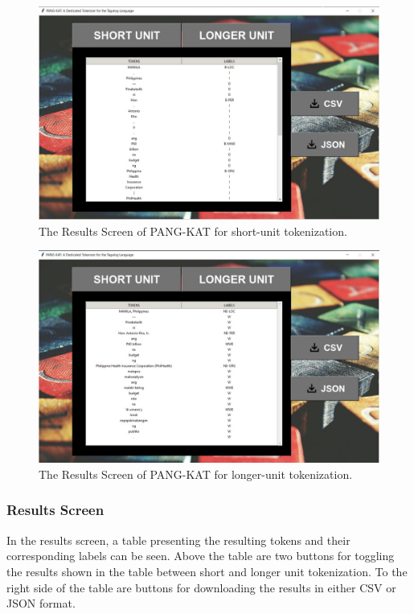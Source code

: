 \documentclass[journal]{./IEEE/IEEEtran}
\begin{document}
\begin{figure}[]
    \centering
    \includegraphics[scale=0.5]{images/Short Unit Tokenization - Demo.JPG}
    \captionsetup{justification=centering}
    \caption{The Results Screen of PANG-KAT for short-unit tokenization. }
\end{figure}

\begin{figure}[]
    \centering
    \includegraphics[scale=0.5]{images/Longer Unit Tokenization - Demo.JPG}
    \captionsetup{justification=centering}
    \caption{The Results Screen of PANG-KAT for longer-unit tokenization.}
\end{figure}

\newpage

\subsubsection{Results Screen}

In the results screen, a table presenting the resulting tokens and their corresponding labels can be seen. Above the table are two buttons for toggling the results shown in the table between short and longer unit tokenization. To the right side of the table are buttons for downloading the results in either CSV or JSON format. \\ 
\end{document}
